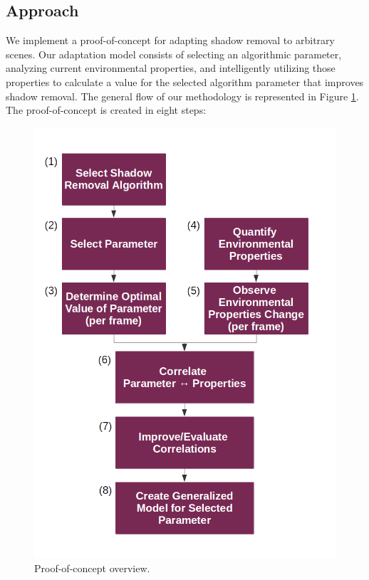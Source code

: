 \documentclass[12pt]{report}
\begin{document}
\subsection{Approach}

We implement a proof-of-concept for adapting shadow removal to arbitrary scenes. Our adaptation model consists of selecting an algorithmic parameter, analyzing current environmental properties, and intelligently utilizing those properties to calculate a value for the selected algorithm parameter that improves shadow removal. The general flow of our methodology is represented in Figure \ref{fig:overview}. The proof-of-concept is created in eight steps:

\begin{figure}
  \centering
  \includegraphics[width=.85\linewidth]{figures/background/overview.png}
  \caption{Proof-of-concept overview.}
  \label{fig:overview}
\end{figure}
\end{document}
